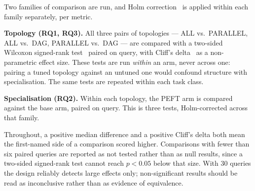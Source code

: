 \documentclass[journal,10pt,compsoc,onecolumn]{IEEEtran}
\begin{document}
Two families of comparison are run, and Holm correction~\cite{holm1979simple} is
applied within each family separately, per metric.

\textbf{Topology (RQ1, RQ3).} All three pairs of topologies --- ALL vs.\
PARALLEL, ALL vs.\ DAG, PARALLEL vs.\ DAG --- are compared with a two-sided
Wilcoxon signed-rank test~\cite{wilcoxon1945individual} paired on query, with
Cliff's delta~\cite{cliff1993dominance} as a non-parametric effect size. These
tests are run \emph{within} an arm, never across one: pairing a tuned topology
against an untuned one would confound structure with specialisation. The same
tests are repeated within each task class.

\textbf{Specialisation (RQ2).} Within each topology, the PEFT arm is compared
against the base arm, paired on query. This is three tests, Holm-corrected across
that family.

Throughout, a positive median difference and a positive Cliff's delta both mean
the first-named side of a comparison scored higher. Comparisons with fewer than
six paired queries are reported as not tested rather than as null results, since a
two-sided signed-rank test cannot reach $p<0.05$ below that size. With 30 queries
the design reliably detects large effects only; non-significant results should be
read as inconclusive rather than as evidence of equivalence.
\end{document}
